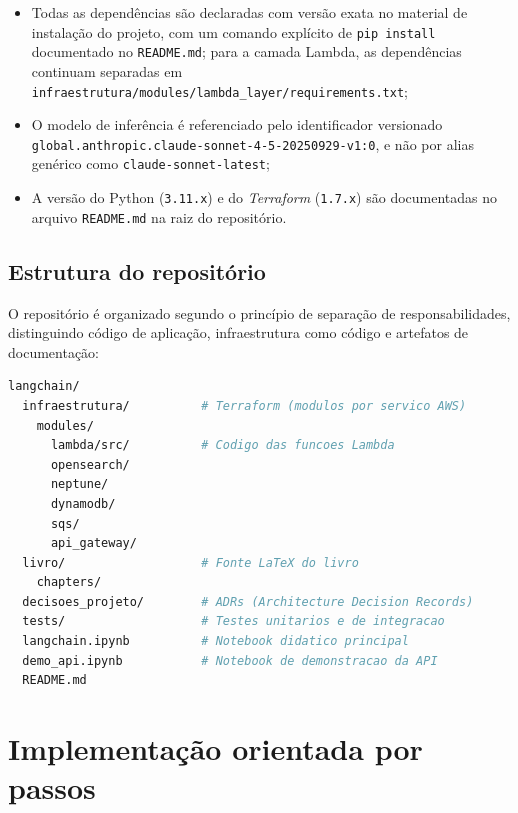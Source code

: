 \begin{itemize}[leftmargin=*]
  \item Todas as depend\^encias s\~ao declaradas com vers\~ao exata no
        material de instala\c{c}\~ao do projeto, com um comando
        expl\'icito de \texttt{pip install} documentado no
        \texttt{README.md}; para a camada Lambda, as depend\^encias
        continuam separadas em
        \texttt{infraestrutura/modules/lambda\_layer/requirements.txt};
  \item O modelo de infer\^encia \'e referenciado pelo identificador
        versionado \nolinkurl{global.anthropic.claude-sonnet-4-5-20250929-v1:0},
        e n\~ao por alias gen\'erico como \texttt{claude-sonnet-latest};
  \item A vers\~ao do Python (\texttt{3.11.x}) e do \textit{Terraform}
        (\texttt{1.7.x}) s\~ao documentadas no arquivo \texttt{README.md}
        na raiz do reposit\'orio.
\end{itemize}

\subsection{Estrutura do reposit\'orio}

O reposit\'orio \'e organizado segundo o princ\'ipio de separa\c{c}\~ao
de responsabilidades, distinguindo c\'odigo de aplica\c{c}\~ao,
infraestrutura como c\'odigo e artefatos de documenta\c{c}\~ao:

\begin{lstlisting}[language=bash,
  caption={Estrutura de diret\'orios do reposit\'orio.},
  label={lst:repo_structure}]
langchain/
  infraestrutura/          # Terraform (modulos por servico AWS)
    modules/
      lambda/src/          # Codigo das funcoes Lambda
      opensearch/
      neptune/
      dynamodb/
      sqs/
      api_gateway/
  livro/                   # Fonte LaTeX do livro
    chapters/
  decisoes_projeto/        # ADRs (Architecture Decision Records)
  tests/                   # Testes unitarios e de integracao
  langchain.ipynb          # Notebook didatico principal
  demo_api.ipynb           # Notebook de demonstracao da API
  README.md
\end{lstlisting}

\section{Implementa\c{c}\~ao orientada por passos}

